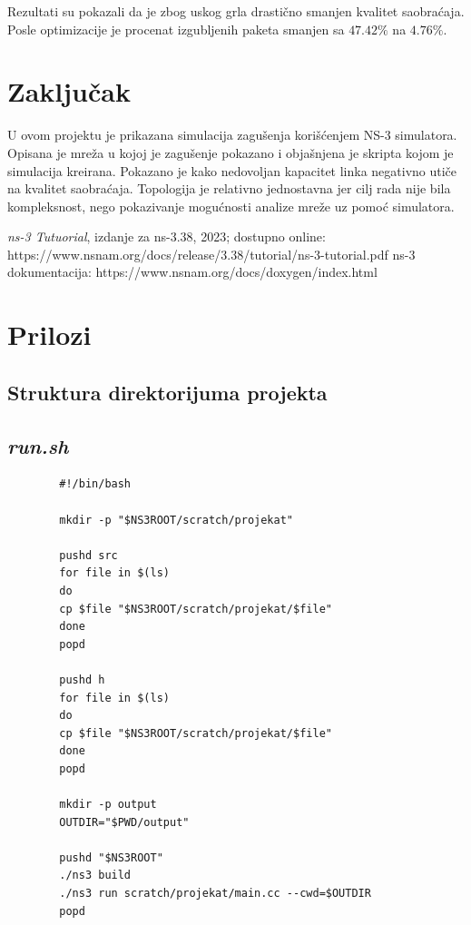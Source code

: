 \documentclass[a4paper, 12pt, projekat]{etf}
\begin{document}
	Rezultati su pokazali da je zbog uskog grla drastično smanjen kvalitet saobraćaja. Posle optimizacije je procenat izgubljenih paketa smanjen sa $47.42\%$ na $4.76\%$.
	
	\chapter{Zaključak}
	U ovom projektu je prikazana simulacija zagušenja korišćenjem NS-3 simulatora. Opisana je mreža u kojoj je zagušenje pokazano i objašnjena je skripta  kojom je simulacija kreirana. Pokazano je kako nedovoljan kapacitet linka negativno utiče na kvalitet saobraćaja. Topologija je relativno jednostavna jer cilj rada nije bila kompleksnost, nego pokazivanje mogućnosti analize mreže uz pomoć simulatora. 
	\begin{thebibliography}{10}
		 \emph{ns-3 Tutuorial}, izdanje za ns-3.38, 2023; dostupno online:
		https://www.nsnam.org/docs/release/3.38/tutorial/ns-3-tutorial.pdf
		 ns-3 dokumentacija: https://www.nsnam.org/docs/doxygen/index.html
 	\end{thebibliography}
 	
	\chapter*{Prilozi} 
	\section*{Struktura direktorijuma projekta}
	\section*{\emph{run.sh}}
	\begin{verbatim}
		#!/bin/bash
		
		mkdir -p "$NS3ROOT/scratch/projekat"
		
		pushd src
		for file in $(ls)
		do
		cp $file "$NS3ROOT/scratch/projekat/$file"
		done
		popd
		
		pushd h
		for file in $(ls)
		do
		cp $file "$NS3ROOT/scratch/projekat/$file"
		done
		popd
		
		mkdir -p output
		OUTDIR="$PWD/output"
		
		pushd "$NS3ROOT"
		./ns3 build
		./ns3 run scratch/projekat/main.cc --cwd=$OUTDIR
		popd
		
	\end{verbatim}
\end{document}

